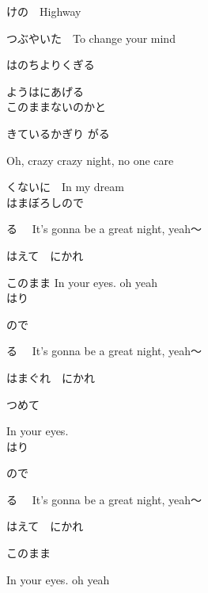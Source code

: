 {けの　Highway

つぶやいた　To change your mind

はのちよりくぎる

ようはにあげる
\\

このままないのかと

きているかぎり がる

Oh, crazy crazy night, no one care

くないに　In my dream
\\

はまぼろしので

る　
It's gonna be a great night, yeah～

はえて　にかれ

このまま In your eyes. oh yeah
\\

はり

ので

る　
It's gonna be a great night, yeah～

はまぐれ　にかれ

つめて　

In your eyes.
\\

はり

ので

る　
It's gonna be a great night, yeah～

はえて　にかれ

このまま 

In your eyes. oh yeah

}